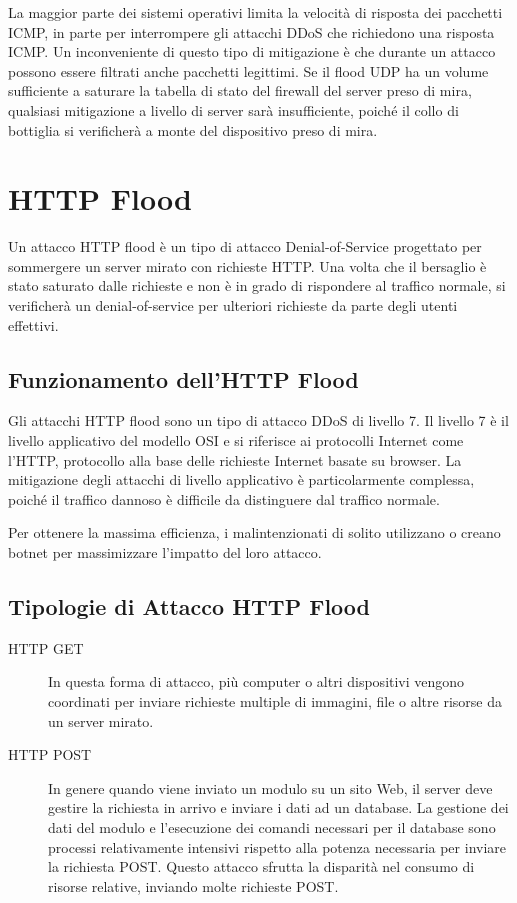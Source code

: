La maggior parte dei sistemi operativi limita la velocità di risposta dei pacchetti ICMP, in parte per interrompere gli attacchi DDoS che richiedono una risposta ICMP. Un inconveniente di questo tipo di mitigazione è che durante un attacco possono essere filtrati anche pacchetti legittimi. Se il flood UDP ha un volume sufficiente a saturare la tabella di stato del firewall del server preso di mira, qualsiasi mitigazione a livello di server sarà insufficiente, poiché il collo di bottiglia si verificherà a monte del dispositivo preso di mira.

\section{HTTP Flood}

Un attacco HTTP flood è un tipo di attacco Denial-of-Service progettato per sommergere un server mirato con richieste HTTP. Una volta che il bersaglio è stato saturato dalle richieste e non è in grado di rispondere al traffico normale, si verificherà un denial-of-service per ulteriori richieste da parte degli utenti effettivi.

\subsection{Funzionamento dell'HTTP Flood}

Gli attacchi HTTP flood sono un tipo di attacco DDoS di livello 7. Il livello 7 è il livello applicativo del modello OSI e si riferisce ai protocolli Internet come l'HTTP, protocollo alla base delle richieste Internet basate su browser. La mitigazione degli attacchi di livello applicativo è particolarmente complessa, poiché il traffico dannoso è difficile da distinguere dal traffico normale.

Per ottenere la massima efficienza, i malintenzionati di solito utilizzano o creano botnet per massimizzare l'impatto del loro attacco.

\subsection{Tipologie di Attacco HTTP Flood}

\begin{description}
    \item[HTTP GET] In questa forma di attacco, più computer o altri dispositivi vengono coordinati per inviare richieste multiple di immagini, file o altre risorse da un server mirato.
    
    \item[HTTP POST] In genere quando viene inviato un modulo su un sito Web, il server deve gestire la richiesta in arrivo e inviare i dati ad un database. La gestione dei dati del modulo e l'esecuzione dei comandi necessari per il database sono processi relativamente intensivi rispetto alla potenza necessaria per inviare la richiesta POST. Questo attacco sfrutta la disparità nel consumo di risorse relative, inviando molte richieste POST.
\end{description}

